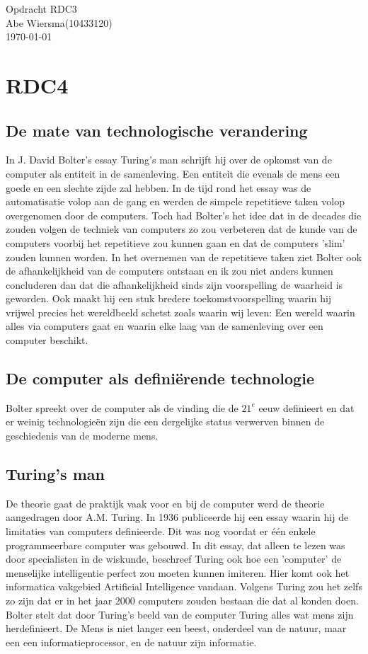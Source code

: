 \documentclass[pdftex,12pt,a4paper]{article}
\begin{document}

\noindent Opdracht RDC3\\ 
Abe Wiersma(10433120)\\
\today
\section*{RDC4}
\subsection{De mate van technologische verandering}
In J. David Bolter's essay Turing's man schrijft hij over de opkomst van de computer als entiteit in de samenleving. Een entiteit die evenals de mens een goede en een slechte zijde zal hebben. In de tijd rond het essay was de automatisatie volop aan de gang en werden de simpele repetitieve taken volop overgenomen door de computers. Toch had Bolter's het idee dat in de decades die zouden volgen de techniek van computers zo zou verbeteren dat de kunde van de computers voorbij het repetitieve zou kunnen gaan en dat de computers 'slim' zouden kunnen worden. In het overnemen van de repetitieve taken ziet Bolter ook de afhankelijkheid van de computers ontstaan en ik zou niet anders kunnen concluderen dan dat die afhankelijkheid sinds zijn voorspelling de waarheid is geworden. Ook maakt hij een stuk bredere toekomstvoorspelling waarin hij vrijwel precies het wereldbeeld schetst zoals waarin wij leven: Een wereld waarin alles via computers gaat en waarin elke laag van de samenleving over een computer beschikt.
\subsection{De computer als definiërende technologie}
Bolter spreekt over de computer als de vinding die de $21^{e}$ eeuw definieert en dat er weinig technologieën zijn die een dergelijke status verwerven binnen de geschiedenis van de moderne mens.

\subsection{Turing's man}
De theorie gaat de praktijk vaak voor en bij de computer werd de theorie aangedragen door A.M. Turing. In 1936 publiceerde hij een essay waarin hij de limitaties van computers definieerde. Dit was nog voordat er één enkele programmeerbare computer was gebouwd. In dit essay, dat alleen te lezen was door specialisten in de wiskunde, beschreef Turing ook hoe een 'computer' de menselijke intelligentie perfect zou moeten kunnen imiteren. Hier komt ook het informatica vakgebied Artificial Intelligence vandaan. Volgens Turing zou het zelfs zo zijn dat er in het jaar 2000 computers zouden bestaan die dat al konden doen.
Bolter stelt dat door Turing's beeld van de computer Turing alles wat mens zijn herdefinieert. De Mens is niet langer een beest, onderdeel van de natuur, maar een een informatieprocessor, en de natuur zijn informatie. 
\end{document}
